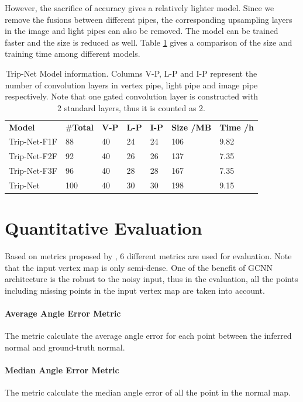 \documentclass[border=15pt, multi, tikz]{article}
\newcommand{\tabhead}[1]{\textbf{#1}}
\begin{document}
However, the sacrifice of accuracy gives a relatively lighter model. Since we remove the fusions between different pipes, the corresponding upsampling layers in the image and light pipes can also be removed. The model can be trained faster and the size is reduced as well. Table \ref{tab:trip-net-size-compare} gives a comparison of the size and training time among different models.


\begin{table}[H]
	
	\centering
	\begin{tabular}{l l l l l l l }
		\tabhead{Model} & $ \# $\textbf{Total} &\textbf{ V-P} & \textbf{L-P} & \textbf{I-P} & \tabhead{Size /MB} & \tabhead{Time /h}\\
		Trip-Net-F1F  			& 88 &  40 & 24 & 24 & 106  &  9.82\\ 
		\hline
		Trip-Net-F2F 			& 92 & 40 & 26 & 26 & 137 &  7.35\\ 
		\hline
		Trip-Net-F3F 			& 96 & 40 & 28 & 28 & 167 &  7.35\\
		\hline
		Trip-Net 				& 100 & 40 & 30 & 30 & 198 & 9.15\\
	\end{tabular}
	\caption{Trip-Net Model information. Columns V-P, L-P and I-P represent the number of convolution layers in vertex pipe, light pipe and image pipe respectively. Note that one gated convolution layer is constructed with 2 standard layers, thus it is counted as 2. }	
	\label{tab:trip-net-size-compare}
\end{table}


\section{Quantitative Evaluation}

Based on metrics proposed by \cite{geometry_based_solution}, 6 different metrics are used for evaluation. Note that the input vertex map is only semi-dense. One of the benefit of GCNN architecture is the robust to the noisy input, thus in the evaluation, all the points including missing points in the input vertex map are taken into account. 

\paragraph{Average Angle Error Metric}
The metric calculate the average angle error for each point between the inferred normal and ground-truth normal. 
\paragraph{Median Angle Error Metric}
The metric calculate the median angle error of all the point in the normal map.
\end{document}
